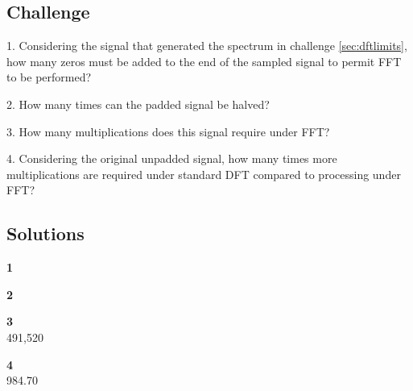 \subsection*{Challenge}
1. Considering the signal that generated the spectrum in challenge \ref{sec:dftlimits}, how many zeros must be added to the end of the sampled signal to permit FFT to be performed?

2. How many times can the padded signal be halved?

3. How many multiplications does this signal require under FFT?

4. Considering the original unpadded signal, how many times more multiplications are required under standard DFT compared to processing under FFT?

\subsection*{Solutions}
\textbf{1}\\

\textbf{2}\\

\textbf{3}\\
491,520

\textbf{4}\\
984.70
\fi
